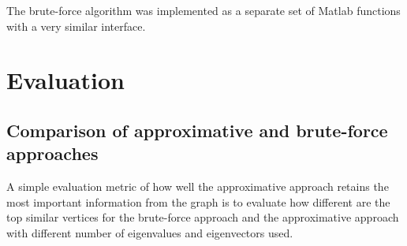 \documentclass[12pt]{report}
\begin{document}
The brute-force algorithm was implemented as a separate set of Matlab functions
with a very similar interface.


%
%
\section*{Evaluation}
\subsection*{Comparison of approximative and brute-force approaches}
%
A simple evaluation metric of how well the approximative approach retains the
most important information from the graph is to evaluate how different are the
top similar vertices for the brute-force approach and the approximative approach
with different number of eigenvalues and eigenvectors used.
\end{document}
